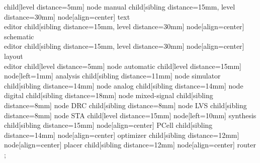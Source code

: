 \tikzset{level distance=15mm}

  child[level distance=5mm] {node {manual}
    child[sibling distance=15mm, level distance=30mm] 
      {node[align=center] {text\\editor}}
    child[sibling distance=15mm, level distance=30mm]
      {node[align=center] {schematic\\editor}}
    child[sibling distance=15mm, level distance=30mm]
      {node[align=center] {layout\\editor}}
  }
  child[level distance=5mm] {node {automatic}
    child[level distance=15mm] {node[left=1mm] {analysis}
      child[sibling distance=11mm] {node {simulator}
        child[sibling distance=14mm] {node {analog}}
        child[sibling distance=14mm] {node {digital}}       
        child[sibling distance=18mm] {node {mixed-signal}}           
      }
      child[sibling distance=8mm] {node {DRC}}
      child[sibling distance=8mm] {node {LVS}}
      child[sibling distance=8mm] {node {STA}}
    }
    child[level distance=15mm] {node[left=10mm] {synthesis}
      child[sibling distance=15mm] {node[align=center] {PCell}}
      child[sibling distance=14mm] {node[align=center] {optimizer}}
      child[sibling distance=12mm] {node[align=center] {placer}}
      child[sibling distance=12mm] {node[align=center] {router}}
  }
};